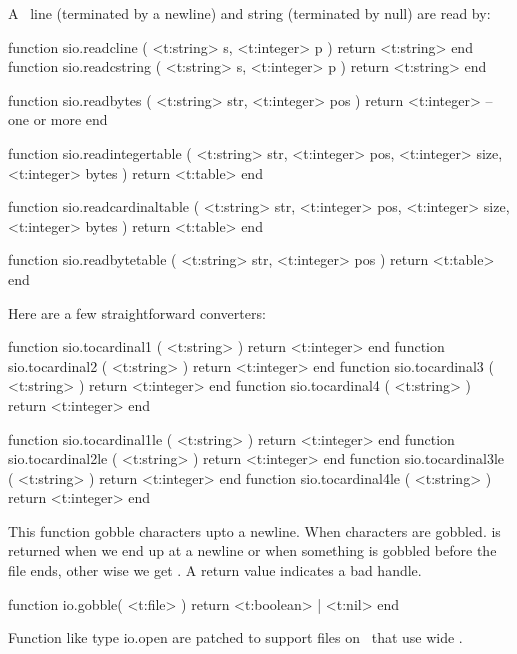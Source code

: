 A \CCODE\ line (terminated by a newline) and string (terminated by null) are read
by:

\starttyping[option=LUA]
function sio.readcline   ( <t:string> s, <t:integer> p ) return <t:string> end
function sio.readcstring ( <t:string> s, <t:integer> p ) return <t:string> end
\stoptyping

\starttyping[option=LUA]
function sio.readbytes (
    <t:string>  str,
    <t:integer> pos
)
    return <t:integer> -- one or more
end
\stoptyping

\starttyping[option=LUA]
function sio.readintegertable (
    <t:string>  str,
    <t:integer> pos,
    <t:integer> size,
    <t:integer> bytes
)
    return <t:table>
end

function sio.readcardinaltable (
    <t:string>  str,
    <t:integer> pos,
    <t:integer> size,
    <t:integer> bytes
)
    return <t:table>
end

function sio.readbytetable (
    <t:string>  str,
    <t:integer> pos
)
    return <t:table>
end
\stoptyping

Here are a few straightforward converters:

\starttyping[option=LUA]
function sio.tocardinal1 ( <t:string> ) return <t:integer> end
function sio.tocardinal2 ( <t:string> ) return <t:integer> end
function sio.tocardinal3 ( <t:string> ) return <t:integer> end
function sio.tocardinal4 ( <t:string> ) return <t:integer> end

function sio.tocardinal1le ( <t:string> ) return <t:integer> end
function sio.tocardinal2le ( <t:string> ) return <t:integer> end
function sio.tocardinal3le ( <t:string> ) return <t:integer> end
function sio.tocardinal4le ( <t:string> ) return <t:integer> end
\stoptyping

\stopsubsection

\startsubsection[title=Extra file helpers]

This function gobble characters upto a newline. When characters are gobbled.
 is returned when we end up at a newline or when something is gobbled
before the file ends, other wise we get . A  return value
indicates a bad handle.

\starttyping[option=LUA]
function io.gobble( <t:file> )
    return <t:boolean> | <t:nil>
end
\stoptyping

Function like type {io.open}  are patched to support files on
\MSWINDOWS\ that use wide \UNICODE.

\stopsubsection

